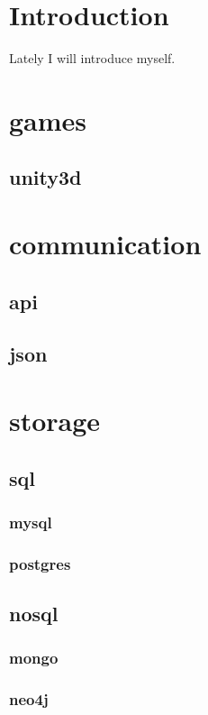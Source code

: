 \documentclass{report}
\begin{document}


\clearpage
\tableofcontents
\clearpage

\chapter{Introduction}
Lately I will introduce myself.

\chapter{games}
\section{unity3d}


\chapter{communication}
\section{api}
\section{json}

\chapter{storage}
\section{sql}
\subsection{mysql}
\subsection{postgres}

\section{nosql}
\subsection{mongo}
\subsection{neo4j}
\end{document}
